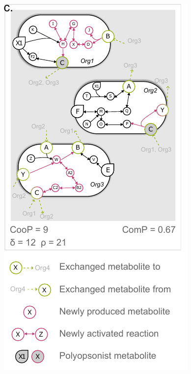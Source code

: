 \documentclass[8pt]{beamer}
\begin{document}
\begin{frame}[fragile]
\begin{onlyenv}
\begin{minipage}{0.5\textwidth}
\end{minipage}%
\hspace{0.5cm}
\hfill
\begin{minipage}{0.4\textwidth}
\includegraphics[width=\textwidth]{figures/score-taille-3.pdf}
\end{minipage}
\end{onlyenv}




\end{frame}
\end{document}
